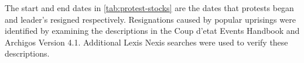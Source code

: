 \documentclass[12pt,final,fleqn]{article}
\theoremstyle{plain}
\begin{document}
%
%
%

The start and end dates in \autoref{tab:protest-stocks} are the dates that protests began and leader's resigned respectively. Resignations caused by popular uprisings were identified by examining the descriptions in the Coup d'etat Events Handbook and Archigos Version 4.1. Additional Lexis Nexis searches were used to verify these descriptions.
\end{document}

